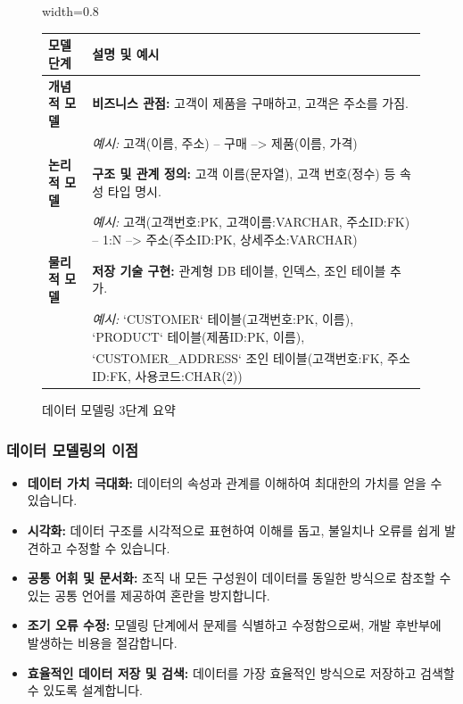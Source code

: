 \documentclass[11pt,a4paper]{article}
\begin{document}
\begin{figure}[h!]
\centering
\begin{adjustbox}{width=0.8\textwidth}
\begin{tabular}{p{}p{}}
\toprule
\textbf{모델 단계} & \textbf{설명 및 예시} \\
\midrule
\textbf{개념적 모델} & \textbf{비즈니스 관점:} 고객이 제품을 구매하고, 고객은 주소를 가짐. \\
& \textit{예시:} 고객(이름, 주소) -- 구매 --> 제품(이름, 가격) \\
\midrule
\textbf{논리적 모델} & \textbf{구조 및 관계 정의:} 고객 이름(문자열), 고객 번호(정수) 등 속성 타입 명시. \\
& \textit{예시:} 고객(고객번호:PK, 고객이름:VARCHAR, 주소ID:FK) -- 1:N --> 주소(주소ID:PK, 상세주소:VARCHAR) \\
\midrule
\textbf{물리적 모델} & \textbf{저장 기술 구현:} 관계형 DB 테이블, 인덱스, 조인 테이블 추가. \\
& \textit{예시:} `CUSTOMER` 테이블(고객번호:PK, 이름), `PRODUCT` 테이블(제품ID:PK, 이름), \\
& `CUSTOMER_ADDRESS` 조인 테이블(고객번호:FK, 주소ID:FK, 사용코드:CHAR(2)) \\
\bottomrule
\end{tabular}
\end{adjustbox}
\caption{데이터 모델링 3단계 요약}
\label{tab:data_modeling_summary}
\end{figure}

\subsubsection{데이터 모델링의 이점}
\begin{itemize}
    \item \textbf{데이터 가치 극대화:} 데이터의 속성과 관계를 이해하여 최대한의 가치를 얻을 수 있습니다.
    \item \textbf{시각화:} 데이터 구조를 시각적으로 표현하여 이해를 돕고, 불일치나 오류를 쉽게 발견하고 수정할 수 있습니다.
    \item \textbf{공통 어휘 및 문서화:} 조직 내 모든 구성원이 데이터를 동일한 방식으로 참조할 수 있는 공통 언어를 제공하여 혼란을 방지합니다.
    \item \textbf{조기 오류 수정:} 모델링 단계에서 문제를 식별하고 수정함으로써, 개발 후반부에 발생하는 비용을 절감합니다.
    \item \textbf{효율적인 데이터 저장 및 검색:} 데이터를 가장 효율적인 방식으로 저장하고 검색할 수 있도록 설계합니다.
\end{itemize}
\end{document}
